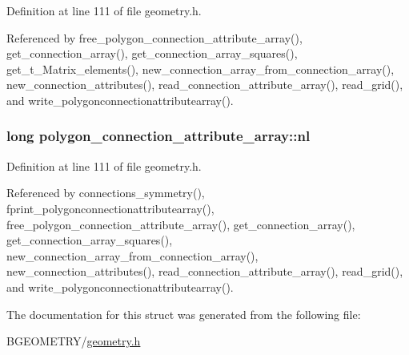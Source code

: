 Definition at line 111 of file geometry.\-h.



Referenced by free\-\_\-polygon\-\_\-connection\-\_\-attribute\-\_\-array(), get\-\_\-connection\-\_\-array(), get\-\_\-connection\-\_\-array\-\_\-squares(), get\-\_\-t\-\_\-\-Matrix\-\_\-elements(), new\-\_\-connection\-\_\-array\-\_\-from\-\_\-connection\-\_\-array(), new\-\_\-connection\-\_\-attributes(), read\-\_\-connection\-\_\-attribute\-\_\-array(), read\-\_\-grid(), and write\-\_\-polygonconnectionattributearray().

\hypertarget{structpolygon__connection__attribute__array_ad86966f39e50790c435874dfc6918e71}{
\subsubsection[{nl}]{\setlength{\rightskip}{0pt plus 5cm}long polygon\-\_\-connection\-\_\-attribute\-\_\-array\-::nl}}\label{structpolygon__connection__attribute__array_ad86966f39e50790c435874dfc6918e71}


Definition at line 111 of file geometry.\-h.



Referenced by connections\-\_\-symmetry(), fprint\-\_\-polygonconnectionattributearray(), free\-\_\-polygon\-\_\-connection\-\_\-attribute\-\_\-array(), get\-\_\-connection\-\_\-array(), get\-\_\-connection\-\_\-array\-\_\-squares(), new\-\_\-connection\-\_\-array\-\_\-from\-\_\-connection\-\_\-array(), new\-\_\-connection\-\_\-attributes(), read\-\_\-connection\-\_\-attribute\-\_\-array(), read\-\_\-grid(), and write\-\_\-polygonconnectionattributearray().



The documentation for this struct was generated from the following file\-:\begin{DoxyCompactItemize}
\item 
B\-G\-E\-O\-M\-E\-T\-R\-Y/\hyperlink{geometry_8h}{geometry.\-h}\end{DoxyCompactItemize}
